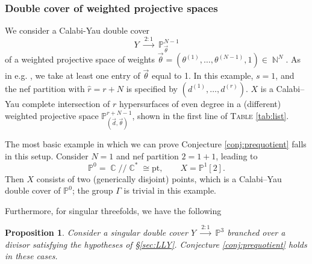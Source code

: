 \documentclass[12pt,a4paper,oneside]{amsart}
\numberwithin{equation}{section}
\newtheorem{prop}[thm]{Proposition}
\theoremstyle{definition}
\theoremstyle{remark}
\DeclareMathOperator{\C}{\mathbb{C}}
\DeclareMathOperator{\N}{\mathbb{N}}
\newcommand{\cP}{\mathbb{P}}
\begin{document}
\subsubsection{Double cover of weighted projective spaces}
We consider a Calabi-Yau double cover 
\begin{equation*}
	Y \ \xrightarrow{ \ 2:1 \ } \ \cP^{N-1}_{\vec{\theta}} 
\end{equation*}
of a weighted projective space of weights $\vec{\theta}=(\theta^{(1)}, \dots, \theta^{(N-1)},1) \in \N^{N}$. As in e.g. \cite{Hosono:1993qy}, we take at least one entry of $\vec{\theta}$ equal to 1. In this example, $s=1$, and the nef partition with $\hat{r}=r+N$ is specified by $(d^{(1)},\dots, d^{(r)})$. $X$ is a Calabi--Yau complete intersection of $r$ hypersurfaces of even degree in a (different) weighted projective space $\cP^{r+N-1}_{(\vec{d}, \vec{\theta})}$, shown in the first line of \textsc{Table} \ref{tab:list}.\par
The most basic example in which we can prove Conjecture \ref{conj:prequotient} falls in this setup. Consider $N=1$ and nef partition $2=1+1$, leading to 
\begin{equation*}
    \cP^0 = \C /\!\!/ \C^{\ast} \cong \mathrm{pt} , \qquad X= \cP^{1}[2] .
\end{equation*}
Then $X$ consists of two (generically disjoint) points, which is a Calabi--Yau double cover of $\cP^0$; the group $\Gamma$ is trivial in this example.\par
Furthermore, for singular threefolds, we have the following
\begin{prop}
    Consider a singular double cover $Y \ \xrightarrow{ \ 2:1 \ } \ \cP^3$ branched over a divisor satisfying the hypotheses of \S\ref{sec:LLY}. Conjecture \ref{conj:prequotient} holds in these cases.
\end{prop}
\end{document}
